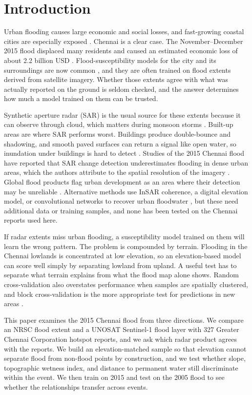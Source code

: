 \documentclass[conference]{IEEEtran}
\begin{document}
\section{Introduction}
Urban flooding causes large economic and social losses, and fast-growing coastal cities are especially exposed \cite{almehedi2025}. Chennai is a clear case. The November--December 2015 flood displaced many residents and caused an estimated economic loss of about 2.2 billion USD \cite{nithiladevi2019}. Flood-susceptibility models for the city and its surroundings are now common \cite{saravanan2022,alabdan2025}, and they are often trained on flood extents derived from satellite imagery. Whether those extents agree with what was actually reported on the ground is seldom checked, and the answer determines how much a model trained on them can be trusted.

Synthetic aperture radar (SAR) is the usual source for these extents because it can observe through cloud, which matters during monsoon storms \cite{almehedi2025,shen2019}. Built-up areas are where SAR performs worst. Buildings produce double-bounce and shadowing, and smooth paved surfaces can return a signal like open water, so inundation under buildings is hard to detect \cite{almehedi2025,wagner2026gfm}. Studies of the 2015 Chennai flood have reported that SAR change detection underestimates flooding in dense urban areas, which the authors attribute to the spatial resolution of the imagery \cite{vanama2019}. Global flood products flag urban development as an area where their detection may be unreliable \cite{misra2025}. Alternative methods use InSAR coherence, a digital elevation model, or convolutional networks to recover urban floodwater \cite{chini2019,mason2021urban,li2019urban}, but these need additional data or training samples, and none has been tested on the Chennai reports used here.

If radar extents miss urban flooding, a susceptibility model trained on them will learn the wrong pattern. The problem is compounded by terrain. Flooding in the Chennai lowlands is concentrated at low elevation, so an elevation-based model can score well simply by separating lowland from upland. A useful test has to separate what terrain explains from what the flood map alone shows. Random cross-validation also overstates performance when samples are spatially clustered, and block cross-validation is the more appropriate test for predictions in new areas \cite{roberts2017}.

This paper examines the 2015 Chennai flood from three directions. We compare an NRSC flood extent and a UNOSAT Sentinel-1 flood layer with 327 Greater Chennai Corporation hotspot reports, and we ask which radar product agrees with the reports. We build an elevation-matched sample so that elevation cannot separate flood from non-flood points by construction, and we test whether slope, topographic wetness index, and distance to permanent water still discriminate within the event. We then train on 2015 and test on the 2005 flood to see whether the relationships transfer across events.
\end{document}
